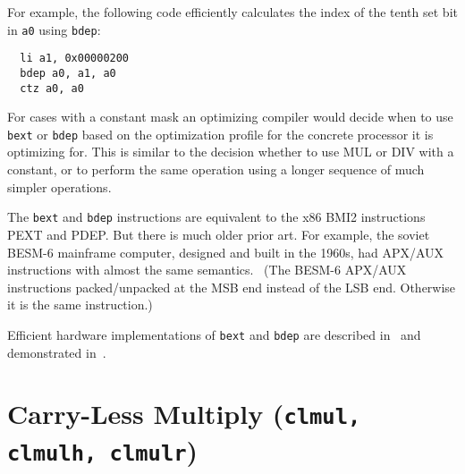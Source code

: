 For example, the following code efficiently calculates the index of the tenth
set bit in {\tt a0} using \texttt{bdep}:

\begin{minipage}{\linewidth}
\begin{verbatim}
  li a1, 0x00000200
  bdep a0, a1, a0
  ctz a0, a0
\end{verbatim}
\end{minipage}

For cases with a constant mask an optimizing compiler would decide when to use
\texttt{bext} or \texttt{bdep} based on the optimization profile for the
concrete processor it is optimizing for. This is similar to the decision
whether to use MUL or DIV with a constant, or to perform the same operation
using a longer sequence of much simpler operations.

The \texttt{bext} and \texttt{bdep} instructions are equivalent to the x86 BMI2
instructions PEXT and PDEP. But there is much older prior art. For example, the
soviet BESM-6 mainframe computer, designed and built in the 1960s, had APX/AUX
instructions with almost the same semantics.~\cite{BESM6} (The BESM-6 APX/AUX
instructions packed/unpacked at the MSB end instead of the LSB end. Otherwise
it is the same instruction.)

Efficient hardware implementations of \texttt{bext} and \texttt{bdep} are described
in~\cite{Hilewitz06} and demonstrated in~\cite{Wolf17B}.

%
%
%
%
%
%
%
%


\section{Carry-Less Multiply (\texttt{clmul, clmulh, clmulr})}

